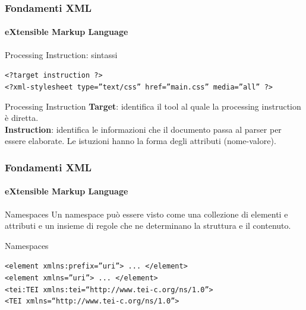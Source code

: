 \begin{frame}
    \frametitle{Fondamenti XML}
    \framesubtitle{eXtensible Markup Language}
    \addtocounter{nframe}{1}

	\begin{block}{Processing Instruction: sintassi}
		\begin{center}
			\texttt{<?target instruction ?>}
			\\\texttt{<?xml-stylesheet type=”text/css” href=”main.css” media=”all” ?>}
		\end{center}
	\end{block}


	\begin{block}{Processing Instruction}
		 \textbf{Target}: identifica il tool al quale la processing instruction è diretta.
		 \\\textbf{Instruction}: identifica le informazioni che il documento passa al parser per essere elaborate. Le istuzioni hanno la forma degli attributi (nome-valore).
	\end{block}

\end{frame}




\begin{frame}
    \frametitle{Fondamenti XML}
    \framesubtitle{eXtensible Markup Language}
    \addtocounter{nframe}{1}

	\begin{block}{Namespaces}
		Un namespace può essere visto come una collezione di elementi e attributi e un insieme di regole che ne determinano la struttura e il contenuto.
	\end{block}

	\begin{block}{Namespaces}
		\begin{center}
			\texttt{<element xmlns:prefix=”uri”> ... </element>}
			\\\texttt{<element xmlns=”uri”> ... </element>}
			\\\texttt{<tei:TEI xmlns:tei=``http://www.tei-c.org/ns/1.0''>}
			\\\texttt{<TEI xmlns=``http://www.tei-c.org/ns/1.0''>}
		\end{center}
	\end{block}

\end{frame}


